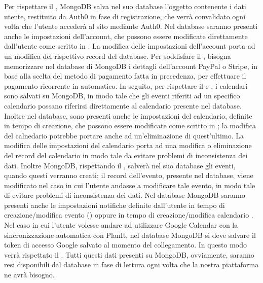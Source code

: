 \begin{listaPersonale}[DCO]{}
    Per rispettare il , MongoDB salva nel suo database l’oggetto contenente i dati utente, restituito da Auth0 in fase di registrazione, che verrà convalidato ogni volta che l’utente accederà al sito mediante Auth0. Nel database saranno presenti anche le impostazioni dell’account, che possono essere modificate direttamente dall’utente come scritto in .  La modifica delle impostazioni dell’account porta ad un modifica del rispettivo record del database. Per soddisfare il , bisogna memorizzare nel database di MongoDB i dettagli dell’account PayPal o Stripe, in base alla scelta del metodo di pagamento fatta in precedenza, per effettuare il pagamento ricorrente in automatico. In seguito, per rispettare il  e , i calendari sono salvati su MongoDB, in modo tale che gli eventi riferiti ad un specifico calendario possano riferirsi direttamente al calendario presente nel database. Inoltre nel database, sono presenti anche le impostazioni del calendario, definite in tempo di creazione, che possono essere modificate come scritto in ; la modifica del calnedario potrebbe portare anche ad un'eliminazione di quest'ultimo. La modifica delle impostazioni del calendario porta ad una modifica o eliminazione del record del calendario in modo tale da evitare problemi di inconsistenza dei dati. Inoltre MongoDB, rispettando il , salverà nel suo database gli eventi, quando questi verranno creati; il record dell’evento, presente nel database, viene modificato nel caso in cui l’utente andasse a modificare tale evento, in modo tale di evitare problemi di inconsistenza dei dati. Nel database MongoDB saranno presenti anche le impostazioni notifiche definite dall’utente in tempo di creazione/modifica evento () oppure in tempo di creazione/modifica calendario . Nel caso in cui l’utente volesse andare ad utilizzare Google Calendar con la sincronizzazione automatica con PlanIt, nel database MongoDB si deve salvare il token di accesso Google salvato al momento del collegamento. In questo modo verrà rispettato il . Tutti questi dati presenti su MongoDB, ovviamente, saranno resi disponibili dal database in fase di lettura ogni volta che la nostra piattaforma ne avrà bisogno.


\end{listaPersonale}
